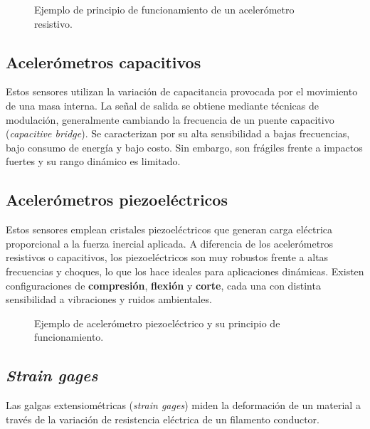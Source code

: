 \begin{figure}[h!]
    \centering
    \fbox{\rule{0pt}{6cm} \rule{10cm}{0pt}}
    \caption{Ejemplo de principio de funcionamiento de un acelerómetro resistivo.}
\end{figure}

\subsection{Acelerómetros capacitivos}
Estos sensores utilizan la variación de capacitancia provocada por el movimiento de una masa interna. 
La señal de salida se obtiene mediante técnicas de modulación, generalmente cambiando la frecuencia de un puente capacitivo (\emph{capacitive bridge}).  
Se caracterizan por su alta sensibilidad a bajas frecuencias, bajo consumo de energía y bajo costo.  
Sin embargo, son frágiles frente a impactos fuertes y su rango dinámico es limitado.

\subsection{Acelerómetros piezoeléctricos}
Estos sensores emplean cristales piezoeléctricos que generan carga eléctrica proporcional a la fuerza inercial aplicada.  
A diferencia de los acelerómetros resistivos o capacitivos, los piezoeléctricos son muy robustos frente a altas frecuencias y choques, lo que los hace ideales para aplicaciones dinámicas.  
Existen configuraciones de \textbf{compresión}, \textbf{flexión} y \textbf{corte}, cada una con distinta sensibilidad a vibraciones y ruidos ambientales.  

\begin{figure}[h!]
    \centering
    \fbox{\rule{0pt}{6cm} \rule{10cm}{0pt}}
    \caption{Ejemplo de acelerómetro piezoeléctrico y su principio de funcionamiento.}
\end{figure}

\subsection{\emph{Strain gages}}

Las galgas extensiométricas (\emph{strain gages}) miden la deformación de un material a través de la variación de resistencia eléctrica de un filamento conductor.  

